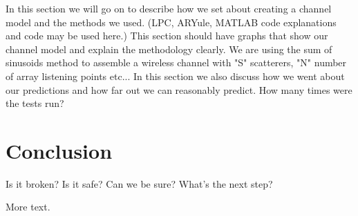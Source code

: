 \documentclass[11pt]{article} %
\begin{document}
In this section we will go on to describe how we set about creating a channel model and the methods we used. (LPC, ARYule, MATLAB code explanations and code may be used here.) This section should have graphs that show our channel model and explain the methodology clearly. We are using the sum of sinusoids method to assemble a wireless channel with "S" scatterers, "N" number of array listening points etc... In this section we also discuss how we went about our predictions and how far out we can reasonably predict. How many times were the tests run?

\section{Conclusion}
Is it broken? Is it safe? Can we be sure? What's the next step?


More text.
\end{document}
